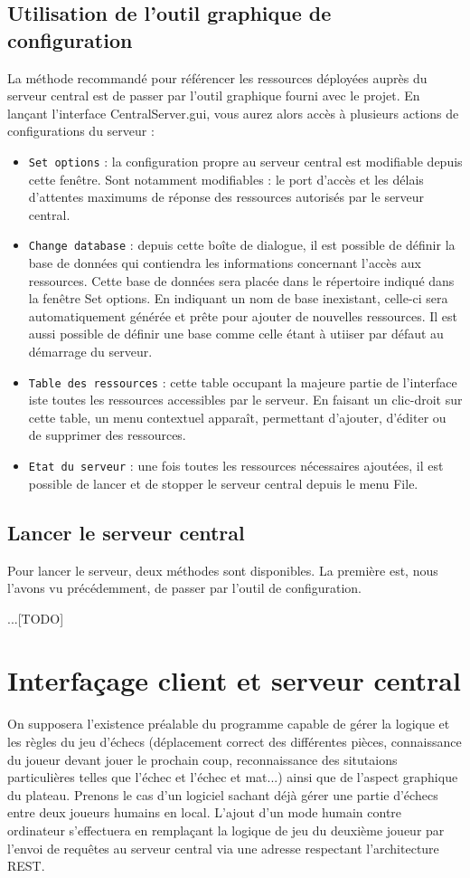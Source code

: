 \documentclass[a4paper,11pt]{article}
\begin{document}
\subsection{Utilisation de l'outil graphique de configuration}
La méthode recommandé pour référencer les ressources déployées auprès du serveur central est de passer par l'outil graphique fourni avec le projet.
En lançant l'interface CentralServer.gui, vous aurez alors accès à plusieurs actions de configurations du serveur :
\begin{itemize}
	\item {\tt Set options} : la configuration propre au serveur central est modifiable depuis cette fenêtre. Sont notamment modifiables : le port d'accès et les délais d'attentes maximums de réponse des ressources autorisés par le serveur central.
	\item {\tt Change database} : depuis cette boîte de dialogue, il est possible de définir la base de données qui contiendra les informations concernant l'accès aux ressources. Cette base de données sera placée dans le répertoire indiqué dans la fenêtre Set options. En indiquant un nom de base inexistant, celle-ci sera automatiquement générée et prête pour ajouter de nouvelles ressources. Il est aussi possible de définir une base comme celle étant à utiiser par défaut au démarrage du serveur.
   \item {\tt Table des ressources} : cette table occupant la majeure partie de l'interface iste toutes les ressources accessibles par le serveur. En faisant un clic-droit sur cette table, un menu contextuel apparaît, permettant d'ajouter, d'éditer ou de supprimer des ressources.
   \item {\tt Etat du serveur} : une fois toutes les ressources nécessaires ajoutées, il est possible de lancer et de stopper le serveur central depuis le menu File.
\end{itemize}
\subsection{Lancer le serveur central}

Pour lancer le serveur, deux méthodes sont disponibles. La première est, nous l'avons vu précédemment, de passer par l'outil de configuration.

		...[TODO]

\section{Interfaçage client et serveur central}
On supposera l'existence préalable du programme capable de gérer la logique et les règles du jeu d'échecs (déplacement correct des différentes pièces, connaissance du joueur devant jouer le prochain coup, reconnaissance des situtaions particulières telles que l'échec et l'échec et mat...) ainsi que de l'aspect graphique du plateau.
Prenons le cas d'un logiciel sachant déjà gérer une partie d'échecs entre deux joueurs humains en local.
L'ajout d'un mode humain contre ordinateur s'effectuera en remplaçant la logique de jeu du deuxième joueur par l'envoi de requêtes au serveur central via une adresse respectant l'architecture REST. 
\end{document}
